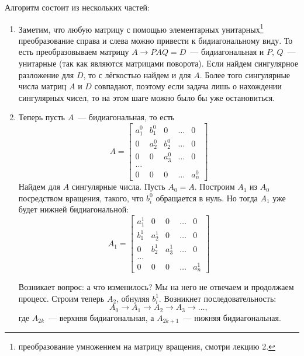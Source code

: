Алгоритм состоит из нескольких частей:
\begin{enumerate}[label=\protect\circled{\arabic*}]
    \item Заметим, что любую матрицу с помощью элементарных унитарных\footnote{преобразование умножением на матрицу вращения, смотри лекцию 2.}
          преобразование справа и слева можно привести к бидиагональному виду. То есть преобразовываем матрицу $A\rightarrow PAQ=D$~--- бидиагональная и
          $P,\, Q$~--- унитарные (так как являются матрицами поворота). Если найдем сингулярное разложение для $D$, то с лёгкостью найдем и для $A$. Более того
          сингулярные числа матриц $A$ и $D$ совпадают, поэтому если задача лишь о нахождении сингулярных чисел, то на этом шаге можно было бы уже остановиться.

    \item Теперь пусть $A$~--- бидиагональная, то есть
          \[
              A = \left[
                  \begin{array}{ccccc}
                      a_1^0 & b_1^0 & 0     & \ldots & 0     \\
                      0     & a_2^0 & b_2^0 & \ldots & 0     \\
                      0     & 0     & a_3^0 & \ldots & 0     \\
                      \ldots                                 \\
                      0     & 0     & 0     & \ldots & a_n^0
                  \end{array}
                  \right]
          \]
          Найдем для $A$ сингулярные числа.
          Пусть $A_0=A$. Построим $A_1$ из $A_0$ посредством вращения, такого, что $b_i^0$ обращается в нуль. Но тогда $A_1$ уже будет нижней бидиагональной:
          \[
              A_1 = \left[
                  \begin{array}{ccccc}
                      a_1^1 & 0     & 0     & \ldots & 0     \\
                      b_1^1 & a_2^1 & 0     & \ldots & 0     \\
                      0     & b_2^1 & a_3^1 & \ldots & 0     \\
                      \ldots                                 \\
                      0     & 0     & 0     & \ldots & a_n^1
                  \end{array}
                  \right]
          \]

          Возникает вопрос: а что изменилось? Мы на него не отвечаем и продолжаем процесс. Строим теперь $A_2$, обнуляя $b_i^1$.
          Возникнет последовательность:
          \[
              A_0\rightarrow A_1\rightarrow A_2\rightarrow A_3\rightarrow\ldots,
          \]
          где $A_{2k}$~--- верхняя бидиагональная, а $A_{2k+1}$~--- нижняя бидиагональная.


\end{enumerate}
